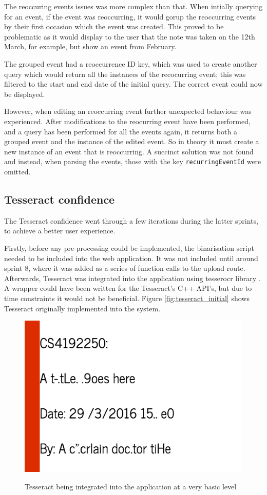 {{{{{{The reoccuring events issues was more complex than that. When intially querying for an event, if the event was reoccurring, it would gorup the reoccurring events by their first occasion which the event was created. This proved to be problematic as it would display to the user that the note was taken on the 12th March, for example, but show an event from February.

The grouped event had a reoccurrence ID key, which was used to create another query which would return all the instances of the recocurring event; this was filtered to the start and end date of the initial query. The correct event could now be displayed.

However, when editing an reoccurring event further unexpected behaviour was experienced. After modifications to the reocurring event have been performed, and a query has been performed for all the events again, it returns both a grouped event and the instance of the edited event. So in theory it must create a new instance of an event that is reoccurring. A succinct solution was not found and instead, when parsing the events, those with the key \texttt{recurringEventId} were omitted.

\subsection{Tesseract confidence}
The Tesseract confidence went through a few iterations during the latter sprints, to achieve a better user experience.

Firstly, before any pre-processing could be implemented, the binarisation script needed to be included into the web application. It was not included until around sprint 8, where it was added as a series of function calls to the upload route. Afterwards, Tesseract was integrated into the application using tesserocr library \cite{citeulike:14021437}. A wrapper could have been written for the Tesseract's C++ API's, but due to time constraints it would not be beneficial. Figure \ref{fig:tesseract_initial} shows Tesseract originally implemented into the system.

\begin{figure}[H]
  \centering
  \includegraphics{images/tesseract_first}
  \label{fig:tesseract_output}
  \caption{Tesseract being integrated into the application at a very basic level}
\end{figure}

}}}}}}
